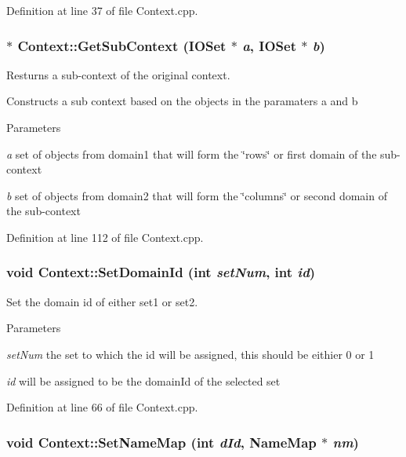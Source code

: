 Definition at line 37 of file Context.cpp.

\hypertarget{class_context_a8bfdcf16db7537122236cab328358e8d}{
\subsubsection[{GetSubContext}]{ $\ast$ Context::GetSubContext ({\bf IOSet} $\ast$ {\em a}, \/  {\bf IOSet} $\ast$ {\em b})}}
\label{class_context_a8bfdcf16db7537122236cab328358e8d}


Resturns a sub-\/context of the original context. 

Constructs a sub context based on the objects in the paramaters a and b 
\begin{DoxyParams}{Parameters}
\item[{\em a}]set of objects from domain1 that will form the \char`\"{}rows\char`\"{} or first domain of the sub-\/context \item[{\em b}]set of objects from domain2 that will form the \char`\"{}columns\char`\"{} or second domain of the sub-\/context \end{DoxyParams}


Definition at line 112 of file Context.cpp.

\hypertarget{class_context_ac7eb147a11e84e49cda654ecc3812fe5}{
\subsubsection[{SetDomainId}]{\setlength{\rightskip}{0pt plus 5cm}void Context::SetDomainId (int {\em setNum}, \/  int {\em id})}}
\label{class_context_ac7eb147a11e84e49cda654ecc3812fe5}


Set the domain id of either set1 or set2. 


\begin{DoxyParams}{Parameters}
\item[{\em setNum}]the set to which the id will be assigned, this should be eithier 0 or 1 \item[{\em id}]will be assigned to be the domainId of the selected set \end{DoxyParams}


Definition at line 66 of file Context.cpp.

\hypertarget{class_context_afb2aabeb42abb6e561a9ea898520baef}{
\subsubsection[{SetNameMap}]{\setlength{\rightskip}{0pt plus 5cm}void Context::SetNameMap (int {\em dId}, \/  {\bf NameMap} $\ast$ {\em nm})}}
\label{class_context_afb2aabeb42abb6e561a9ea898520baef}


